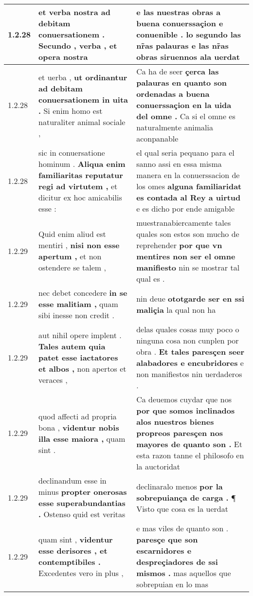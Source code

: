 \begin{tabular}{|p{1cm}|p{6.5cm}|p{6.5cm}|}
1.2.28 & et verba nostra \textbf{ ad debitam conuersationem . } Secundo , verba , et opera nostra & e las nuestras obras a buena conuerssaçion e conuenible . \textbf{ lo segundo las nr̃as palauras } e las nr̃as obras siruennos ala uerdat \\\hline
1.2.28 & et uerba , \textbf{ ut ordinantur ad debitam conuersationem in uita . } Si enim homo est naturaliter animal sociale , & Ca ha de seer \textbf{ çerca las palauras en quanto son ordenadas a buena conuerssaçion en la uida del omne . } Ca si el omne es naturalmente animalia aconpanable \\\hline
1.2.28 & sic in conuersatione hominum . \textbf{ Aliqua enim familiaritas reputatur regi ad virtutem , } et dicitur ex hoc amicabilis esse : & el qual seria pequano para el sanno assi en essa misma manera en la conuerssacion de los omes \textbf{ alguna familiaridat es contada al Rey a uirtud } e es dicho por ende amigable \\\hline
1.2.29 & Quid enim aliud est mentiri , \textbf{ nisi non esse apertum , } et non ostendere se talem , & muestranabiercamente tales quales son estos son mucho de reprehender \textbf{ por que vn mentires non ser el omne manifiesto } nin se mostrar tal qual es . \\\hline
1.2.29 & nec debet concedere \textbf{ in se esse malitiam , } quam sibi inesse non credit . & nin deue \textbf{ ototgarde ser en ssi maliçia } la qual non ha \\\hline
1.2.29 & aut nihil opere implent . \textbf{ Tales autem quia patet esse iactatores et albos , } non apertos et veraces , & delas quales cosas muy poco o ninguna cosa non cunplen por obra . \textbf{ Et tales paresçen seer alabadores e encubridores } e non manifiestos nin uerdaderos . \\\hline
1.2.29 & quod affecti ad propria bona , \textbf{ videntur nobis illa esse maiora , } quam sint . & Ca deuemos cuydar que nos \textbf{ por que somos inclinados alos nuestros bienes propreos paresçen nos mayores de quanto son . } Et esta razon tanne el philosofo en la auctoridat \\\hline
1.2.29 & declinandum esse in minus \textbf{ propter onerosas esse superabundantias . } Ostenso quid est veritas & declinaralo menos \textbf{ por la sobrepuiança de carga . } ¶ Visto que cosa es la uerdat \\\hline
1.2.29 & quam sint , \textbf{ videntur esse derisores , et contemptibiles . } Excedentes vero in plus , & e mas viles de quanto son . \textbf{ paresçe que son escarnidores e despreçiadores de ssi mismos . } mas aquellos que sobrepuian en lo mas \\\hline

\end{tabular}
